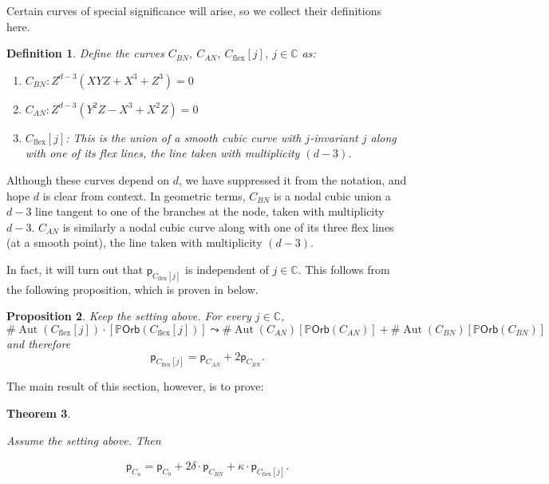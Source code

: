 \documentclass[12 pt, reqno]{amsart}
\newtheorem{thm}{Theorem}[section]
\newtheorem{prop}[thm]{Proposition}
\newtheorem{defn}[thm]{Definition}
\theoremstyle{definition}
\newcommand{\on}{\operatorname}
\newcommand{\mb}{\mathbb}
\renewcommand{\P}{\mb{P}}
\newcommand{\Orb}{\mathsf{Orb}}
\renewcommand{\k}{\mathbb{C}}
\newcommand{\p}{\mathsf{p}}
\begin{document}
  Certain curves of special significance will arise, so we collect
  their definitions here.

  \begin{defn}
    \label{specialcurves} Define the curves $C_{BN}$, $C_{AN}$,
    $C_{\on{flex}}[j]$, $j \in \k$ as:
    \begin{enumerate}
    \item $C_{BN}: Z^{d-3}(XYZ + X^3 + Z^3) = 0$\\
    \item $C_{AN}: Z^{d-3}(Y^2Z - X^3 + X^2Z) = 0$\\
    \item $C_{\on{flex}}[j]$: This is the union of a smooth cubic
      curve with $j$-invariant $j$ along with one of its flex lines,
      the line taken with multiplicity $(d-3)$.
    \end{enumerate}
  \end{defn}
 
  Although these curves depend on $d$, we have suppressed it from the
  notation, and hope $d$ is clear from context.  In geometric terms,
  $C_{BN}$ is a nodal cubic union a $d-3$ line tangent to one of the
  branches at the node, taken with multiplicity $d-3$. $C_{AN}$ is
  similarly a nodal cubic curve along with one of its three flex lines
  (at a smooth point), the line taken with multiplicity $(d-3)$.


  In fact, it will turn out that $\p_{C_{\on{flex}}[j]}$ is
  independent of $j \in \k$.  This follows from the following
  proposition, which is proven in  below.

  
  \begin{prop}
    \label{prop:CANCBN}
    Keep the setting above. For every $j \in \k$,
  \[\# \on{Aut}(C_{\on{flex}}[j]) \cdot [\P \Orb(C_{\on{flex}}[j])]
    \leadsto \#\on{Aut}(C_{AN})[\P \Orb(C_{AN})] +
    \#\on{Aut}(C_{BN})[\P \Orb(C_{BN})]\] and therefore
  \[\p_{C_{\on{flex}}[j]} = \p_{C_{AN}} + 2\p_{C_{BN}}.\]
\end{prop}

The main result of this section, however, is to prove:

\begin{thm}
  \label{nodecusp}
  
  Assume the setting above. Then

\begin{align}
  \p_{C_{u}} = \p_{C_{0}} + 2\delta  \cdot \p_{C_{BN}} + \kappa \cdot   \p_{C_{\on{flex}}[j]}.
\end{align}
\end{thm}
\end{document}
